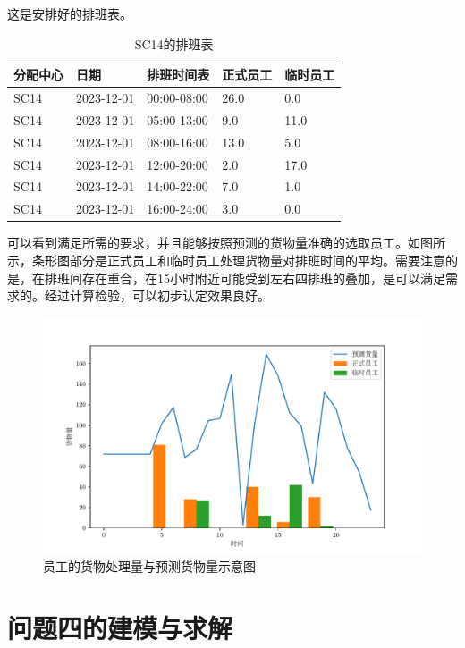 \documentclass[UTF8]{article}%
\begin{document}
这是安排好的排班表。

\begin{table}[!ht]
\renewcommand\arraystretch{1.2}
\caption{SC14的排班表}%
\centering%
\begin{tabular}{p{2.5cm}<{\centering}p{2.5cm}<{\centering}p{2.5cm}<{\centering}p{2.5cm}<{\centering}p{2.5cm}<{\centering}}%
\toprule%
分配中心&日期&排班时间表&正式员工&临时员工 \\
\midrule%
SC14&2023-12-01&00:00-08:00&26.0&0.0\\
SC14&2023-12-01&05:00-13:00&9.0&11.0\\
SC14&2023-12-01&08:00-16:00&13.0&5.0\\
SC14&2023-12-01&12:00-20:00&2.0&17.0\\
SC14&2023-12-01&14:00-22:00&7.0&1.0\\
SC14&2023-12-01&16:00-24:00&3.0&0.0\\
\bottomrule%
\end{tabular}
\end{table}
可以看到满足所需的要求，并且能够按照预测的货物量准确的选取员工。如图所示，条形图部分是正式员工和临时员工处理货物量对排班时间的平均。需要注意的是，在排班间存在重合，在15小时附近可能受到左右四排班的叠加，是可以满足需求的。经过计算检验，可以初步认定效果良好。
\begin{figure}
    \centering
    \includegraphics*[width=0.8\linewidth]{images/pb.pdf}
    \caption{员工的货物处理量与预测货物量示意图}
\end{figure}





\clearpage
\section{问题四的建模与求解}
\end{document}
